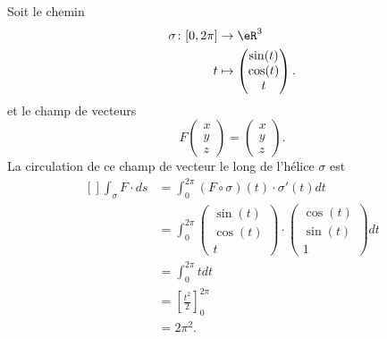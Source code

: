 \begin{example}
	Soit le chemin
	\begin{equation}
		\begin{aligned}
			\sigma\colon \mathopen[ 0 , 2\pi \mathclose] & \to \eR^3                           \\
			t                                            & \mapsto \begin{pmatrix}
				\sin(t) \\
				\cos(t) \\
				t
			\end{pmatrix}.
		\end{aligned}
	\end{equation}
	et le champ de vecteurs
	\begin{equation}
		F\begin{pmatrix}
			x \\
			y \\
			z
		\end{pmatrix}=\begin{pmatrix}
			x \\
			y \\
			z
		\end{pmatrix}.
	\end{equation}
	La circulation de ce champ de vecteur le long de l'hélice $\sigma$ est
	\begin{equation}
		\begin{aligned}[]
			\int_{\sigma}F\cdot ds & =\int_0^{2\pi}(F\circ \sigma)(t)\cdot \sigma'(t)dt \\
			                       & =\int_0^{2\pi}\begin{pmatrix}
				\sin(t) \\
				\cos(t) \\
				t
			\end{pmatrix}\cdot
			\begin{pmatrix}
				\cos(t) \\
				\sin(t) \\
				1
			\end{pmatrix}dt                                                \\
			                       & =\int_0^{2\pi}tdt                                  \\
			                       & =\left[ \frac{ t^2 }{2} \right]_0^{2\pi}           \\
			                       & =2\pi^2.
		\end{aligned}
	\end{equation}

\end{example}

